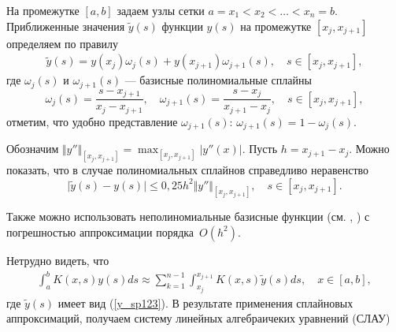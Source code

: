 \documentclass{spisok-article}
\begin{document}
На промежутке $\left[a,b\right]$ задаем узлы сетки $a= x_1 < x_2 < \ldots < x_n = b$. Приближенные значения $\tilde y\left(s\right)$ функции $y\left(s\right)$ на промежутке $\left[x_j,x_{j+1}\right]$ определяем по правилу
\begin{equation}
	\begin{gathered}
		\tilde y \left(s\right)=y\left(x_j\right)\omega_j\left(s\right)+y\left(x_{j+1}\right)\omega_{j+1}\left(s\right),\quad s\in\left[x_j, x_{j+1}\right],
	\end{gathered}
	\label{y_sp123}
\end{equation}
где $\omega_{j}\left(s\right)$ и $\omega_{j+1}\left(s\right)$ --- базисные полиномиальные сплайны
$$
\omega_j\left(s\right)=\frac{s-x_{j+1}}{x_j-x_{j+1}},\quad \omega_{j+1}\left(s\right)=\frac{s-x_j}{x_{j+1}-x_j}, \quad s\in\left[x_j, x_{j+1}\right],
$$
отметим, что удобно представление $\omega_{j+1}\left(s\right)$:
$
\omega_{j+1}\left(s\right)=1-\omega_{j}\left(s\right).
$

Обозначим
$
\Vert y''\Vert_{[x_j,x_{j+1}]}=\max_{\left[x_j,x_{j+1}\right]}\left|y''\left(x\right)\right|.
$
Пусть $h=x_{j+1}-x_j$. Можно показать, что в случае полиномиальных сплайнов
справедливо неравенство
$$
\vert \tilde{y}(s)-y(s)\vert \leqslant 0,\!25 h^2 \Vert y''\Vert_{[x_j,x_{j+1}]},\quad s\in[x_j,x_{j+1}].
$$

Также можно использовать неполиномиальные базисные функции (см. \cite{BurovaIG}, \cite{BurovaIG_AG}) с погрешностью аппроксимации порядка~$O(h^2)$.

Нетрудно видеть, что
$$
\begin{gathered}
	\int^b_a K\left(x,s\right)y\left(s\right)ds\approx\sum_{k=1}^{n-1}\int_{x_j}^{x_{j+1}}K\left(x,s\right)\tilde y\left(s\right)ds,	\quad x\in \left[a,b\right],
\end{gathered}
$$
где $\tilde y\left(s\right)$ имеет вид (\ref{y_sp123}). В результате применения сплайновых аппроксимаций, получаем систему линейных алгебраичеких уравнений (СЛАУ)
\end{document}
